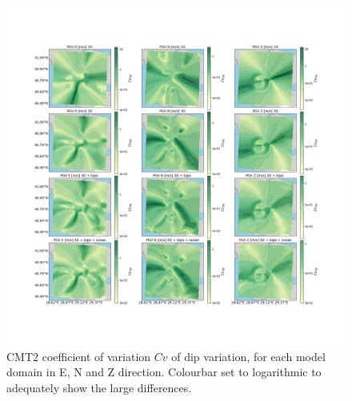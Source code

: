 \documentclass[../Text/00main.tex]{subfiles}
\begin{document}
\begin{figure}
    \centering
    \includegraphics[width=1\linewidth,trim = 2cm 5cm 1cm 5cm, clip]{images_results/dip_variation_sigma_sc2.png}
    \caption{CMT2 coefficient of variation $Cv$ of dip variation, for each model domain in E, N and Z direction. Colourbar set to logarithmic to adequately show the large differences.}
    \label{fig:cmt2sigm}
\end{figure}
\end{document}
